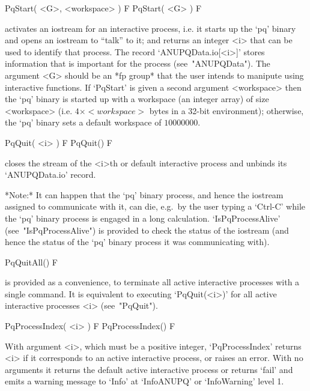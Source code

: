 
\>PqStart( <G>, <workspace> ) F
\>PqStart( <G> ) F

activates an iostream for an interactive {\ANUPQ} process, i.e. it starts
up the `pq' binary and opens an iostream to ``talk'' to it;  and  returns
an integer <i> that can be used to  identify  that  process.  The  record
`ANUPQData.io[<i>]' stores information that is important for the  process
(see~"ANUPQData"). The argument <G> should be an *fp group* that the user
intends to manipute using interactive {\ANUPQ} functions. If `PqStart' is
given a second argument <workspace> then the `pq' binary  is  started  up
with a workspace (an integer array) of size <workspace> (i.e.  $4  \times
<workspace>$ bytes in a 32-bit environment); otherwise, the  `pq'  binary
sets a default workspace of $10000000$.

\>PqQuit( <i> ) F
\>PqQuit() F

closes the stream of the <i>th or default  interactive  {\ANUPQ}  process
and unbinds its `ANUPQData.io' record.

*Note:*
It can happen that the `pq' binary process, and hence the {\GAP} iostream
assigned to communicate with it, can  die,  e.g.~by  the  user  typing  a
`Ctrl-C' while the `pq' binary process is engaged in a long  calculation.
`IsPqProcessAlive' (see~"IsPqProcessAlive")  is  provided  to  check  the
status of the {\GAP} iostream (and hence the status of  the  `pq'  binary
process it was communicating with).

\>PqQuitAll() F

is provided  as  a  convenience,  to  terminate  all  active  interactive
{\ANUPQ} processes with a single command. It is equivalent  to  executing
`PqQuit(<i>)'  for  all  active  interactive   {\ANUPQ}   processes   <i>
(see~"PqQuit").


\>PqProcessIndex( <i> ) F
\>PqProcessIndex() F

With argument <i>, which must be  a  positive  integer,  `PqProcessIndex'
returns <i> if it corresponds to an active interactive process, or raises
an error. With no arguments it returns  the  default  active  interactive
process or returns `fail' and  emits  a  warning  message  to  `Info'  at
`InfoANUPQ' or `InfoWarning' level 1.

